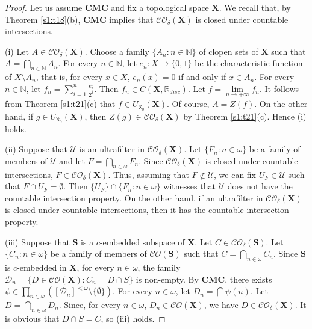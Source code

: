 \documentclass[12pt,twoside,leqno]{article}
\theoremstyle{plain}
\theoremstyle{definition}
\theoremstyle{remark}
\begin{document}
\begin{proof}
	Let us assume $\mathbf{CMC}$ and fix a topological space $\mathbf{X}$. We recall that, by Theorem \ref{s1:t18}(b), $\mathbf{CMC}$ implies that $\mathcal{CO}_{\delta}(\mathbf{X})$ is closed under countable intersections.
	
	
	(i) Let $A\in\mathcal{CO}_{\delta}(\mathbf{X})$. Choose a family $\{A_n: n\in\mathbb{N}\}$ of clopen sets of $\mathbf{X}$ such that $A=\bigcap\limits_{n\in\mathbb{N}}A_n$. For every $n\in\mathbb{N}$, let $e_n: X\to\{0, 1\}$ be the characteristic function of $X\setminus A_n$, that is, for every $x\in X$,  $e_n(x)=0$ if and only if $x\in A_n$. For every $n\in\mathbb{N}$, let $f_n=\sum\limits_{i=1}^{n}\frac{e_i}{2^i}$. Then $f_n\in C(\mathbf{X}, \mathbb{R}_{disc})$. Let $f=\lim\limits_{n\to+\infty}f_n$. It follows from Theorem \ref{s1:t21}(c) that $f\in U_{\aleph_0}(\mathbf{X})$. Of course, $A=Z(f)$. On the other hand, if $g\in U_{\aleph_0}(\mathbf{X})$, then $Z(g)\in\mathcal{CO}_{\delta}(\mathbf{X})$ by Theorem \ref{s1:t21}(c). Hence (i) holds.
	
	(ii) Suppose that $\mathcal{U}$ is an ultrafilter in $\mathcal{CO}_{\delta}(\mathbf{X})$. Let $\{F_n: n\in\omega\}$ be a family of members of $\mathcal{U}$ and  let $F=\bigcap\limits_{n\in\omega}F_n$. Since $\mathcal{CO}_{\delta}(\mathbf{X})$ is closed under countable intersections,  $F\in\mathcal{CO}_{\delta}(\mathbf{X})$. Thus, assuming that  $F\notin\mathcal{U}$, we can fix $U_F\in\mathcal{U}$ such that $F\cap U_F=\emptyset$. Then $\{ U_F\}\cap\{F_n: n\in\omega\}$ witnesses that $\mathcal{U}$ does not have the countable intersection property. On the other hand, if an ultrafilter in $\mathcal{CO}_{\delta}(\mathbf{X})$ is closed under countable intersections, then it has the countable intersection property. 
	
	(iii) Suppose that $\mathbf{S}$ is a $c$-embedded subspace of $\mathbf{X}$. Let $C\in\mathcal{CO}_{\delta}(\mathbf{S})$. Let $\{C_n: n\in\omega\}$ be a family of members of $\mathcal{CO}(\mathbf{S})$ such that $C=\bigcap\limits_{n\in\omega}C_n$. Since $\mathbf{S}$ is $c$-embedded in $\mathbf{X}$, for every $n\in\omega$, the family $\mathcal{D}_n=\{D\in\mathcal{CO}(\mathbf{X}): C_n=D\cap S\}$ is non-empty. By $\mathbf{CMC}$, there exists $\psi\in\prod\limits_{n\in\omega}([\mathcal{D}_n]^{<\omega}\setminus\{\emptyset\})$. For every $n\in\omega$, let $D_n=\bigcap\psi(n)$. Let $D=\bigcap\limits_{n\in\omega}D_n$. Since, for every $n\in\omega$, $D_n\in\mathcal{CO}(\mathbf{X})$, we have $D\in\mathcal{CO}_{\delta}(\mathbf{X})$. It is obvious that $D\cap S=C$, so (iii) holds.
\end{proof}
\end{document}
